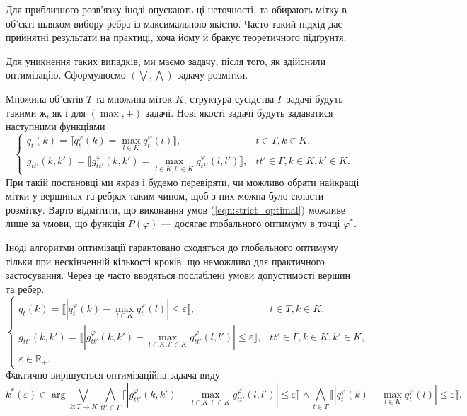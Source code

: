 Для приблизного розв'язку іноді опускають ці неточності, та обирають мітку в об'єкті 
шляхом вибору ребра із максимальною якістю. Часто такий підхід дає прийнятні результати 
на практиці, хоча йому й бракує теоретичного підґрунтя. 

Для уникнення таких випадків, ми маємо задачу, після того, як здійснили оптимізацію.
Сформулюємо $(\bigvee, \bigwedge)$-задачу розмітки.

Множина об'єктів $T$ та множина міток $K$, структура сусідства $\Gamma$ задачі будуть такими ж, як і для 
$(\max,+)$ задачі. Нові якості задачі будуть задаватися наступними функціями
\begin{equation}
    \begin{cases}
    \label{eqn:strict_optimal}
    q_t(k) = \llbracket q^{\varphi}_t(k) = \max\limits_{l\in K}q^{\varphi}_t(l) \rrbracket, & t\in T, k\in K,\\
    g_{tt'}(k,k') = \llbracket g^\varphi_{tt'}(k,k')=\max\limits_{l\in K, l'\in K}g^{\varphi}_{tt'}(l,l')\rrbracket,
     & tt'\in\Gamma, k\in K, k'\in K.
\end{cases}
\end{equation}
При такій постановці ми якраз і будемо перевіряти, чи можливо обрати найкращі
мітки у вершинах та ребрах таким чином, щоб з них можна було скласти розмітку.
Варто відмітити, що виконання умов (\ref{eqn:strict_optimal}) можливе лише за
умови, що функція $P(\varphi)$ --- досягає глобального оптимуму в точці $\varphi^*$.  

Іноді алгоритми оптимізації гарантовано сходяться до глобального оптимуму
тільки при нескінченній кількості кроків, що неможливо для практичного застосування.
Через це часто вводяться послаблені умови допустимості вершин та ребер.
\begin{equation}
    \begin{cases}
    \label{eqn:epsilon_optimal}
    q_t(k) = \llbracket |q^{\varphi}_t(k) - \max\limits_{l\in K}q^{\varphi}_t(l)|\leq \varepsilon\rrbracket, & t\in T, k\in K,\\
    g_{tt'}(k,k') = \llbracket|g^\varphi_{tt'}(k,k')-\max\limits_{l\in K, l'\in K}g^{\varphi}_{tt'}(l,l')|\leq\varepsilon\rrbracket,
     & tt'\in\Gamma, k\in K, k'\in K,\\
    \varepsilon \in \mathbb{R_+}.
\end{cases}
\end{equation}
Фактично вирішується оптимізаційна задача виду
\begin{equation}
    k^*(\varepsilon)\in\arg\bigvee_{k:T\rightarrow K}\bigwedge_{tt'\in\Gamma}
    \llbracket|g^\varphi_{tt'}(k,k')-\max\limits_{l\in K, l'\in K}g^{\varphi}_{tt'}(l,l')|\leq\varepsilon\rrbracket\wedge
    \bigwedge_{t\in T}\llbracket|q^{\varphi}_t(k) - \max\limits_{l\in K}q^{\varphi}_t(l)|\leq \varepsilon\rrbracket.
\end{equation}

